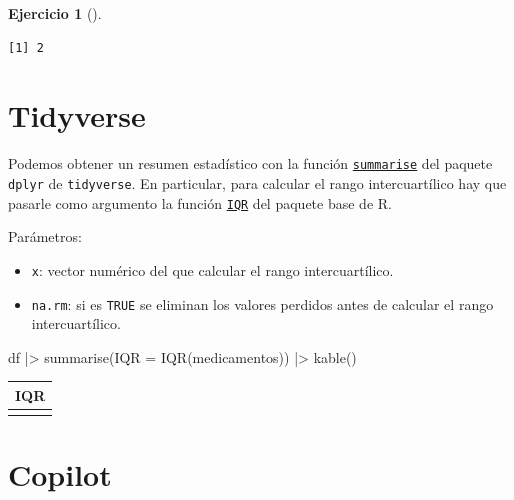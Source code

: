 \documentclass[
  a4paper,
]{scrreport}
\newenvironment{Shaded}{\begin{snugshade}}{\end{snugshade}}
\newcommand{\AttributeTok}[1]{\textcolor[rgb]{0.40,0.45,0.13}{#1}}
\newcommand{\FunctionTok}[1]{\textcolor[rgb]{0.28,0.35,0.67}{#1}}
\newcommand{\NormalTok}[1]{\textcolor[rgb]{0.00,0.23,0.31}{#1}}
\newcommand{\SpecialCharTok}[1]{\textcolor[rgb]{0.37,0.37,0.37}{#1}}
\providecommand{\tightlist}{%
  \setlength{\itemsep}{0pt}\setlength{\parskip}{0pt}}\usepackage{longtable,booktabs,array}
\theoremstyle{definition}
\newtheorem{exercise}{Ejercicio}[chapter]
\theoremstyle{remark}
\begin{document}
\begin{exercise}[]
\begin{enumerate}
\begin{tcolorbox}
\begin{Shaded}
\end{Shaded}

\begin{verbatim}
[1] 2
\end{verbatim}

  \section{Tidyverse}

  Podemos obtener un resumen estadístico con la función
  \href{https://dplyr.tidyverse.org/reference/summarise.html}{\texttt{summarise}}
  del paquete \texttt{dplyr} de \texttt{tidyverse}. En particular, para
  calcular el rango intercuartílico hay que pasarle como argumento la
  función
  \href{https://www.rdocumentation.org/packages/base/versions/3.6.2/topics/IQR}{\texttt{IQR}}
  del paquete base de R.

  Parámetros:

  \begin{itemize}
  \tightlist
  \item
    \texttt{x}: vector numérico del que calcular el rango
    intercuartílico.
  \item
    \texttt{na.rm}: si es \texttt{TRUE} se eliminan los valores perdidos
    antes de calcular el rango intercuartílico.
  \end{itemize}

\begin{Shaded}
\begin{Highlighting}[]
\NormalTok{df }\SpecialCharTok{|\textgreater{}} \FunctionTok{summarise}\NormalTok{(}\AttributeTok{IQR =} \FunctionTok{IQR}\NormalTok{(medicamentos)) }\SpecialCharTok{|\textgreater{}}
    \FunctionTok{kable}\NormalTok{()}
\end{Highlighting}
\end{Shaded}

  \begin{longtable}[]{@{}r@{}}
  \toprule\noalign{}
  IQR \\
  \midrule\noalign{}
  \endhead
  \bottomrule\noalign{}
  \endlastfoot
  2 \\
  \end{longtable}

  \section{Copilot}


\end{tcolorbox}
\end{enumerate}
\end{exercise}
\end{document}
